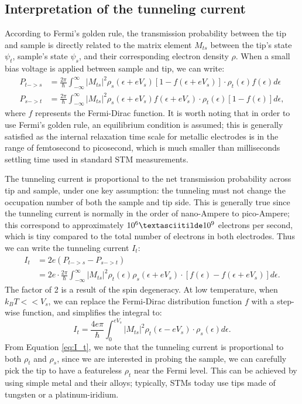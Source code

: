 \subsection{Interpretation of the tunneling current}
According to Fermi's golden rule, the transmission probability between the tip and sample is directly related to the matrix element $M_{ts}$ between the tip's state $\psi_{t}$, sample's state $\psi_{s}$, and their corresponding electron density $\rho$. When a small bias voltage is applied between sample and tip, we can write:
\begin{align}
	P_{t->s} &= \frac{2\pi}{\hslash}\int_{-\infty}^{\infty}|M_{ts}|^2\rho_s(\epsilon + eV_s)[1-f(\epsilon+eV_s)]\cdot \rho_t(\epsilon)f(\epsilon) d\epsilon \\
	P_{s->t} &= \frac{2\pi}{\hslash}\int_{-\infty}^{\infty}|M_{ts}|^2\rho_s(\epsilon + eV_s)f(\epsilon+eV_s)\cdot \rho_t(\epsilon)[1-f(\epsilon)] d\epsilon,
\end{align} 
where $f$ represents the Fermi-Dirac function. It is worth noting that in order to use Fermi's golden rule, an equilibrium condition is assumed; this is generally satisfied as the internal relaxation time scale for metallic electrodes is in the range of femtosecond to picosecond, which is much smaller than milliseconds settling time used in standard \ac{STM} measurements. 

The tunneling current is proportional to the net transmission probability across tip and sample, under one key assumption: the tunneling must not change the occupation number of both the sample and tip side. This is generally true since the tunneling current is normally in the order of nano-Ampere to pico-Ampere; this correspond to approximately $10^6 \textasciitilde 10^9$ electrons per second, which is tiny compared to the total number of electrons in both electrodes. Thus we can write the tunneling current $I_t$:
\begin{align}
	I_t & = 2e(P_{t->s}-P_{s->t})\\
	& = 2e \cdot \frac{2\pi}{\hslash}\int_{-\infty}^{\infty}|M_{ts}|^2\rho_t(\epsilon) \rho_s(\epsilon + eV_s) \cdot[f(\epsilon) - f(\epsilon + eV_s)] d\epsilon.
\end{align}
The factor of 2 is a result of the spin degeneracy. At low temperature, when $k_BT<<V_s$, we can replace the Fermi-Dirac distribution function $f$ with a step-wise function, and simplifies the integral to: 
\begin{equation}
	\label{eq:I_t}
	I_t = \frac{4e\pi}{\hslash}\int_{0}^{eV_s}|M_{ts}|^2\rho_t(\epsilon - eV_s) \cdot \rho_s(\epsilon)d\epsilon. 
\end{equation} 
From Equation \ref{eq:I_t}, we note that the tunneling current is proportional to both $\rho_t$ and $\rho_s$, since we are interested in probing the sample, we can carefully pick the tip to have a featureless $\rho_t$ near the Fermi level. This can be achieved by using simple metal and their alloys; typically, \ac{STM}s today use tips made of tungsten or a platinum-iridium.


